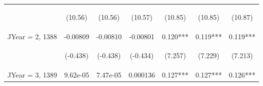 \documentclass{standalone}
\begin{document}
\begin{tabular}{lcccccc}
    \vspace{4pt}     & \begin{footnotesize}(10.56)\end{footnotesize}   & \begin{footnotesize}(10.56)\end{footnotesize}   & \begin{footnotesize}(10.57)\end{footnotesize}   & \begin{footnotesize}(10.85)\end{footnotesize}  & \begin{footnotesize}(10.85)\end{footnotesize}  & \begin{footnotesize}(10.87)\end{footnotesize}  \\
    JYear = 2, 1388  & -0.00809                                        & -0.00810                                        & -0.00801                                        & 0.120***                                       & 0.119***                                       & 0.119***                                       \\
    \vspace{4pt}     & \begin{footnotesize}(-0.438)\end{footnotesize}  & \begin{footnotesize}(-0.438)\end{footnotesize}  & \begin{footnotesize}(-0.434)\end{footnotesize}  & \begin{footnotesize}(7.257)\end{footnotesize}  & \begin{footnotesize}(7.229)\end{footnotesize}  & \begin{footnotesize}(7.213)\end{footnotesize}  \\
    JYear = 3, 1389  & 9.62e-05                                        & 7.47e-05                                        & 0.000136                                        & 0.127***                                       & 0.127***                                       & 0.126***                                       \\

\end{tabular}
\end{document}
